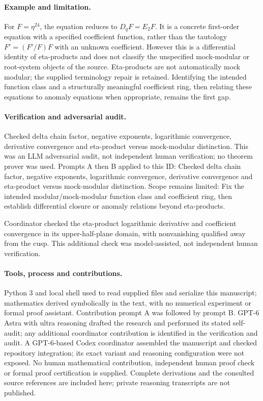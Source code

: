 \documentclass[11pt]{article}
\begin{document}
\paragraph{Example and limitation.}For \(F=\eta^{24}\), the equation reduces to \(D_qF=E_2F\). It is a concrete first-order equation with a specified coefficient function, rather than the tautology \(F'=(F'/F)F\) with an unknown coefficient. However this is a differential identity of eta-products and does not classify the unspecified mock-modular or root-system objects of the source. Eta-products are not automatically mock modular; the supplied terminology repair is retained. Identifying the intended function class and a structurally meaningful coefficient ring, then relating these equations to anomaly equations when appropriate, remains the first gap.

\paragraph{Verification and adversarial audit.}
Checked delta chain factor, negative exponents, logarithmic convergence, derivative convergence and eta-product versus mock-modular distinction. This was an LLM adversarial audit, not independent human verification; no theorem prover was used. Prompts A then B applied to this ID: Checked delta chain factor, negative exponents, logarithmic convergence, derivative convergence and eta-product versus mock-modular distinction. Scope remains limited: Fix the intended modular/mock-modular function class and coefficient ring, then establish differential closure or anomaly relations beyond eta-products.

Coordinator checked the eta-product logarithmic derivative and coefficient convergence in its upper-half-plane domain, with nonvanishing qualified away from the cusp. This additional check was model-assisted, not independent human verification.

\paragraph{Tools, process and contributions.}
Python 3 and local shell used to read supplied files and serialize this manuscript; mathematics derived symbolically in the text, with no numerical experiment or formal proof assistant. Contribution prompt A was followed by prompt B. GPT-6 Astra with ultra reasoning drafted the research and performed its stated self-audit; any additional coordinator contribution is identified in the verification and audit. A GPT-6-based Codex coordinator assembled the manuscript and checked repository integration; its exact variant and reasoning configuration were not exposed. No human mathematical contribution, independent human proof check or formal proof certification is supplied. Complete derivations and the consulted source references are included here; private reasoning transcripts are not published.
\end{document}
